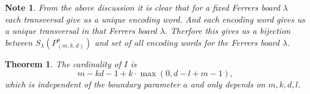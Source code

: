 \documentclass[12pt, english, a4paper]{article}
\theoremstyle{plain}
\newtheorem{theorem}{Theorem}
\newtheorem{note}{Note}
\theoremstyle{definition}
\theoremstyle{remark}
\begin{document}






\begin{note}\label{bijection}
    From the above discussion it is clear that for a fixed Ferrers board $\lambda$ each transversal give us a unique encoding word. And each encoding word gives us a unique transversal in that Ferrers board $\lambda$. Therfore this gives us a bijection between $S_{\lambda}(P^a_{(m,k,d)})$ and set of all encoding words for the Ferrers board $\lambda$.
\end{note}


\begin{theorem}\label{size_I}
    The cardinality of $I$ is 
    $$m - kd - 1 + k \cdot \max(0, d - l + m - 1),$$ which is independent of the boundary parameter $a$ and only depends on $m,k,d,l$.
\end{theorem}
\end{document}
